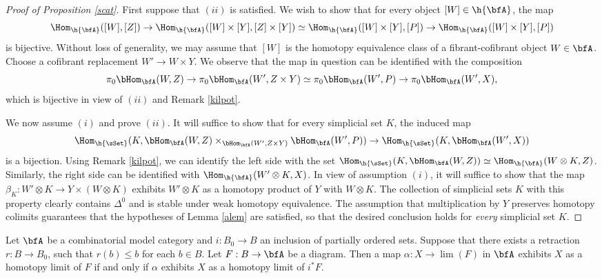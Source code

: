 \begin{Simplicial Categories}
\begin{proof}[Proof of Proposition \ref{scat}]
First suppose that $(ii)$ is satisfied. We wish to show that for every object
$[W] \in \h{\bfA}$, the map
$$ \Hom_{\h{\bfA}}( [W], [Z] ) \rightarrow
\Hom_{ \h{\bfA} }( [W] \times [Y], [Z] \times [Y])
\simeq \Hom_{ \h{\bfA}}( [W] \times [Y], [P] ) \rightarrow \Hom_{\h{\bfA}}( [W] \times [Y], [P] )$$
is bijective. Without loss of generality, we may assume that $[W]$ is the homotopy equivalence class
of a fibrant-cofibrant object $W \in \bfA$. Choose a cofibrant replacement $W' \rightarrow W \times Y$.
We observe that the map in question can be identified with the composition
$$ \pi_0 \bHom_{ \bfA}( W, Z) \rightarrow \pi_0 \bHom_{ \bfA}( W', Z \times Y)
\simeq \pi_0 \bHom_{\bfA}( W', P) \rightarrow \pi_0 \bHom_{\bfA}( W',X),$$
which is bijective in view of $(ii)$ and Remark \ref{kilpot}.

We now assume $(i)$ and prove $(ii)$. It will suffice to show that for every simplicial
set $K$, the induced map
$$\Hom_{\h{\sSet}}( K, \bHom_{\bfA}(W,Z) \times_{ \bHom_{\bfA}( W', Z \times Y) } \bHom_{\bfA}(W', P)
) \rightarrow \Hom_{\h{\sSet}}(K, \bHom_{\bfA}(W',X) )$$
is a bijection. Using Remark \ref{kilpot}, we can identify the left side with the
set $\Hom_{\h{\sSet}}(K, \bHom_{\bfA}(W,Z)) \simeq \Hom_{\h{\bfA}}( W \otimes K, Z)$.
Similarly, the right side can be identified with $\Hom_{\h{\bfA}}( W' \otimes K, X)$.
In view of assumption $(i)$, it will suffice to show that the map
$\beta_{K}: W' \otimes K \rightarrow Y \times (W \otimes K)$
exhibits $W' \otimes K$ as a homotopy product of $Y$ with $W \otimes K$.
The collection of simplicial sets $K$ with this property clearly contains
$\Delta^0$ and is stable under weak homotopy equivalence. The assumption
that multiplication by $Y$ preserves homotopy colimits guarantees that the hypotheses of
Lemma \ref{alem} are satisfied, so that the desired conclusion holds for {\em every} simplicial set $K$.
\end{proof}

\begin{lemma}\label{tukka}
Let $\bfA$ be a combinatorial model category and $i: B_0 \rightarrow B$
an inclusion of partially ordered sets. Suppose that there exists a retraction
$r: B \rightarrow B_0$, such that $r(b) \leq b$ for each $b \in B$.
Let $F: B \rightarrow \bfA$ be a diagram. Then a map
$\alpha: X \rightarrow \lim(F)$ in $\bfA$ exhibits $X$ as a homotopy limit of
$F$ if and only if $\alpha$ exhibits $X$ as a homotopy limit of $i^{\ast} F$.
\end{lemma}


\end{Simplicial Categories}
